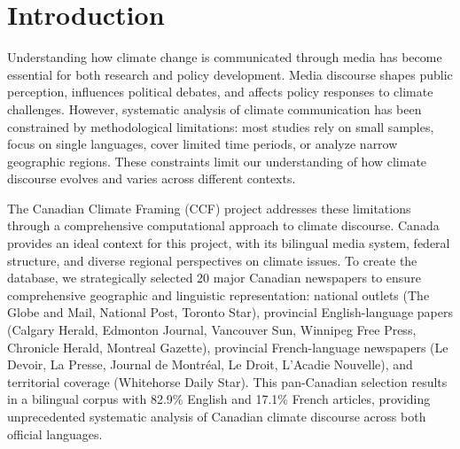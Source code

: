 \documentclass[12pt]{article}
\begin{document}

\section{Introduction}

Understanding how climate change is communicated through media has become essential for both research and policy development. Media discourse shapes public perception, influences political debates, and affects policy responses to climate challenges. However, systematic analysis of climate communication has been constrained by methodological limitations: most studies rely on small samples, focus on single languages, cover limited time periods, or analyze narrow geographic regions. These constraints limit our understanding of how climate discourse evolves and varies across different contexts.

The Canadian Climate Framing (CCF) project addresses these limitations through a comprehensive computational approach to climate discourse. Canada provides an ideal context for this project, with its bilingual media system, federal structure, and diverse regional perspectives on climate issues. To create the database, we strategically selected 20 major Canadian newspapers to ensure comprehensive geographic and linguistic representation: national outlets (The Globe and Mail, National Post, Toronto Star), provincial English-language papers (Calgary Herald, Edmonton Journal, Vancouver Sun, Winnipeg Free Press, Chronicle Herald, Montreal Gazette), provincial French-language newspapers (Le Devoir, La Presse, Journal de Montréal, Le Droit, L'Acadie Nouvelle), and territorial coverage (Whitehorse Daily Star). This pan-Canadian selection results in a bilingual corpus with 82.9\% English and 17.1\% French articles, providing unprecedented systematic analysis of Canadian climate discourse across both official languages.
\end{document}
